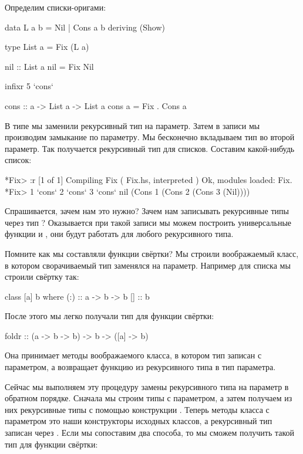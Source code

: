 Определим списки-оригами:


\begin{code}
data L a b = Nil | Cons a b
    deriving (Show)

type List a = Fix (L a)

nil :: List a
nil = Fix Nil

infixr 5 `cons`

cons :: a -> List a -> List a
cons a = Fix . Cons a
\end{code}

В типе  мы заменили рекурсивный тип на параметр. Затем в записи
 мы производим замыкание по параметру. Мы
бесконечно вкладываем тип  во второй параметр. Так получается
рекурсивный тип для списков. Составим какой-нибудь список:


\begin{code}
*Fix> :r
[1 of 1] Compiling Fix              ( Fix.hs, interpreted )
Ok, modules loaded: Fix.
*Fix> 1 `cons` 2 `cons` 3 `cons` nil
(Cons 1 (Cons 2 (Cons 3 (Nil))))
\end{code}

Спрашивается, зачем нам это нужно? Зачем нам записывать рекурсивные типы
через тип ? Оказывается при такой записи мы можем построить
универсальные функции  и , они будут работать для
любого рекурсивного типа.

Помните как мы составляли функции свёртки? Мы строили воображаемый
класс, в котором сворачиваемый тип заменялся на параметр. Например для
списка мы строили свёртку так:


\begin{code}
class [a] b where
    (:) :: a -> b -> b
    []  :: b
\end{code}

После этого мы легко получали тип для функции свёртки:


\begin{code}
foldr :: (a -> b -> b) -> b -> ([a] -> b)
\end{code}

Она принимает методы воображаемого класса, в котором тип записан с
параметром, а возвращает функцию из рекурсивного типа в тип параметра.

Сейчас мы выполняем эту процедуру замены рекурсивного типа на параметр в
обратном порядке. Сначала мы строим типы с параметром, а затем получаем
из них рекурсивные типы с помощью конструкции . Теперь методы
класса с параметром это наши конструкторы исходных классов, а
рекурсивный тип записан через . Если мы сопоставим два способа,
то мы сможем получить такой тип для функции свёртки:


